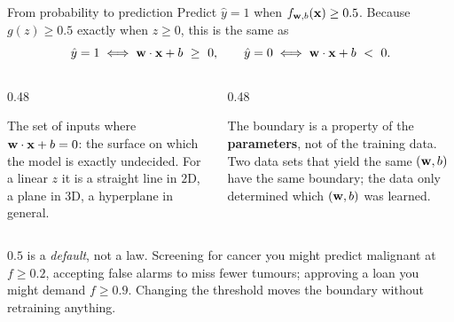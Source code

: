 \documentclass[aspectratio=169,10pt]{beamer}
\begin{document}
\begin{frame}{From probability to prediction}
  \footnotesize
  Predict $\hat y = 1$ when $f_{\mathbf{w},b}(\mathbf{x})\ge 0.5$. Because $g(z)\ge 0.5$ exactly when
  $z\ge 0$, this is the same as
  \[
    \hat y = 1 \iff \mathbf{w}\cdot\mathbf{x} + b \ \ge\ 0 ,
    \qquad
    \hat y = 0 \iff \mathbf{w}\cdot\mathbf{x} + b \ <\ 0 .
  \]
  \begin{columns}[T,onlytextwidth]
    \begin{column}{0.48\textwidth}
      \begin{defnbox}
        \small The set of inputs where $\mathbf{w}\cdot\mathbf{x}+b=0$: the surface on which the model is
        exactly undecided. For a linear $z$ it is a straight line in $2$D, a plane in $3$D, a
        hyperplane in general.
      \end{defnbox}
    \end{column}
    \begin{column}{0.48\textwidth}
      \begin{keyidea}
        \small The boundary is a property of the \textbf{parameters}, not of the training
        data. Two data sets that yield the same $(\mathbf{w},b)$ have the same boundary; the data
        only determined which $(\mathbf{w},b)$ was learned.
      \end{keyidea}
    \end{column}
  \end{columns}
  \vspace{1mm}
  \begin{pitfall}
    $0.5$ is a \emph{default}, not a law. Screening for cancer you might predict malignant at
    $f\ge 0.2$, accepting false alarms to miss fewer tumours; approving a loan you might
    demand $f\ge 0.9$. Changing the threshold moves the boundary without retraining anything.
  \end{pitfall}
\end{frame}
\end{document}
